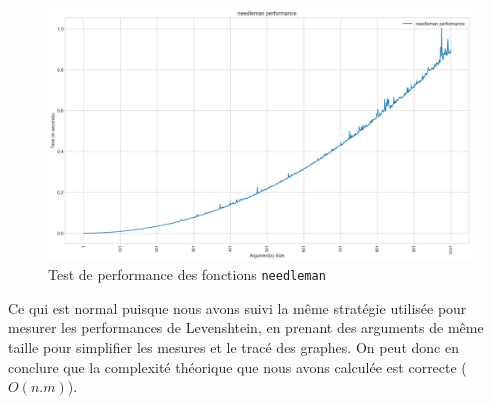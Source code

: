 \documentclass[12pt]{article}
\begin{document}
    \begin{figure}[!h]
        \centering
        \includegraphics[scale=0.55]{Images/Performance/Needleman-Wunsch/performance_needleman_normal.png}
        \caption{Test de performance des fonctions \texttt{needleman}}
        \label{perfnwnormal}
    \end{figure}
Ce qui est normal puisque nous avons suivi la même stratégie utilisée pour mesurer les performances de Levenshtein, en prenant des arguments de même taille pour simplifier les mesures et le tracé des graphes. On peut donc en conclure que la complexité théorique que nous avons calculée est correcte ($O(n.m)$).
\end{document}
